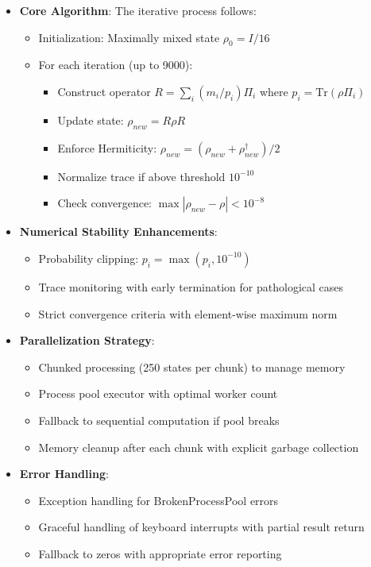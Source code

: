 \documentclass{optica-article}
\begin{document}
\begin{itemize}
\item \textbf{Core Algorithm}: The iterative process follows:
\begin{itemize}
\item Initialization: Maximally mixed state $\rho_0 = I/16$
\item For each iteration (up to 9000):
  \begin{itemize}
  \item Construct operator $R = \sum_i (m_i/p_i)\Pi_i$ where $p_i = \text{Tr}(\rho \Pi_i)$
  \item Update state: $\rho_{new} = R\rho R$
  \item Enforce Hermiticity: $\rho_{new} = (\rho_{new} + \rho_{new}^\dagger)/2$
  \item Normalize trace if above threshold $10^{-10}$
  \item Check convergence: $\max|\rho_{new} - \rho| < 10^{-8}$
  \end{itemize}
\end{itemize}

\item \textbf{Numerical Stability Enhancements}:
\begin{itemize}
\item Probability clipping: $p_i = \max(p_i, 10^{-10})$
\item Trace monitoring with early termination for pathological cases
\item Strict convergence criteria with element-wise maximum norm
\end{itemize}

\item \textbf{Parallelization Strategy}:
\begin{itemize}
\item Chunked processing (250 states per chunk) to manage memory
\item Process pool executor with optimal worker count
\item Fallback to sequential computation if pool breaks
\item Memory cleanup after each chunk with explicit garbage collection
\end{itemize}

\item \textbf{Error Handling}:
\begin{itemize}
\item Exception handling for BrokenProcessPool errors
\item Graceful handling of keyboard interrupts with partial result return
\item Fallback to zeros with appropriate error reporting
\end{itemize}
\end{itemize}
\end{document}
